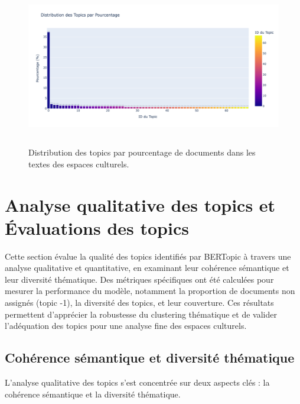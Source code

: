 \documentclass[mstat,12pt]{unswthesis}
\begin{document}
\begin{figure}[H]
    \centering
    \includegraphics[width=14cm,height=7cm]{DistributionParDoc.png}
    \caption{Distribution des topics par pourcentage de documents dans les textes des espaces culturels. }
    \label{fig:enquete}
\end{figure}

\section{Analyse qualitative des topics et Évaluations des topics }

Cette section évalue la qualité des topics identifiés par BERTopic à travers une analyse 
qualitative et quantitative, en examinant leur cohérence sémantique et leur diversité 
thématique. Des métriques spécifiques ont été calculées pour mesurer la performance du 
modèle, notamment la proportion de documents non assignés (topic -1), la diversité des 
topics, et leur couverture. Ces résultats permettent d’apprécier la robustesse du clustering 
thématique et de valider l’adéquation des topics pour une analyse fine des espaces culturels.

\subsection{Cohérence sémantique et diversité thématique }

L’analyse qualitative des topics s’est concentrée sur deux aspects clés : la cohérence 
sémantique et la diversité thématique. 
\end{document}

